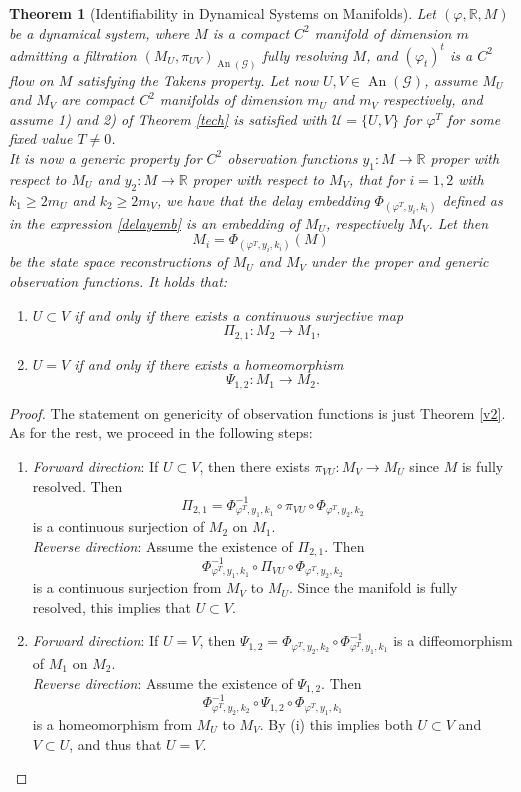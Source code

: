 \documentclass[11pt, a4paper]{memoir}
\theoremstyle{break}
\newtheorem{thm}{Theorem}
\theoremstyle{break}
\theoremstyle{nonumberplain}
\newtheorem{proof}{Proof}
\newcommand{\mR}{\mathbb{R}}
\DeclareMathOperator{\an}{An}
\begin{document}
\begin{thm}[Identifiability in Dynamical Systems on Manifolds]\label{id1}
Let $(\varphi,\mR,M)$ be a dynamical system, where $M$ is a compact $C^2$ manifold of dimension $m$ admitting a filtration $(M_U,\pi_{UV})_{\an(\mathcal{G})}$ fully resolving $M$, and $(\varphi_t)^t$ is a $C^2$ flow on $M$ satisfying the Takens property. Let now $U,V\in \an(\mathcal{G})$, assume $M_U$ and $M_V$ are compact $C^2$ manifolds of dimension $m_U$ and $m_V$ respectively, and assume 1) and 2) of Theorem \ref{tech} is satisfied with $\mathcal{U}=\{U,V\}$ for $\varphi^T$ for some fixed value $T\neq 0$.\\[5pt]
It is now a generic property for $C^2$ observation functions $y_1:M\to \mR$ proper with respect to $M_U$ and $y_2:M\to\mR$ proper with respect to $M_V$, that for $i=1,2$ with $k_1\geqslant 2m_U$ and $k_2\geqslant 2m_V$, we have that the delay embedding $\Phi_{(\varphi^T,y_i,k_i)}$ defined as in the expression \ref{delayemb} is an embedding of $M_U$, respectively $M_V$. Let then $$M_i=\Phi_{(\varphi^T,y_i,k_i)}(M)$$ 
be the state space reconstructions of $M_U$ and $M_V$ under the proper and generic observation functions. It holds that:
\begin{enumerate}[label=(\roman*)]
	\item $U\subset V$ if and only if there exists a continuous surjective map
	$$\Pi_{2,1}:M_2\to M_1,$$ 
	\item $U=V$ if and only if there exists a homeomorphism
	$$\Psi_{1,2}:M_1\to M_2.$$
\end{enumerate}
\end{thm}
\begin{proof}
The statement on genericity of observation functions is just Theorem \ref{v2}. As for the rest, we proceed in the following steps:
\begin{enumerate}[label=(\roman*)]
	\item \textit{Forward direction}: If $U\subset V$, then there exists $\pi_{VU}:M_V\to M_U$ since $M$ is fully resolved. Then
	$$\Pi_{2,1}=\Phi_{\varphi^T,y_1,k_1}^{-1}\circ\pi_{VU}\circ \Phi_{\varphi^T,y_2,k_2} $$ is a continuous surjection of $M_2$ on $M_1$.\\[5pt]
	\textit{Reverse direction}: Assume the existence of $\Pi_{2,1}$. Then
	$$\Phi_{\varphi^T,y_1,k_1}^{-1} \circ\Pi_{VU}\circ  \Phi_{\varphi^T,y_2,k_2} $$
	is a continuous surjection from $M_V$ to $M_U$. Since the manifold is fully resolved, this implies that $U\subset V$.
	\item \textit{Forward direction}: If $U=V$, then $\Psi_{1,2}=\Phi_{\varphi^T,y_2,k_2}\circ \Phi_{\varphi^T,y_1,k_1}^{-1}$ is a diffeomorphism of $M_1$ on $M_2$.\\[5pt]
	\textit{Reverse direction}: Assume the existence of $\Psi_{1,2}$. Then
	$$\Phi_{\varphi^T,y_2,k_2}^{-1}\circ \Psi_{1,2} \circ \Phi_{\varphi^T,y_1,k_1}$$
	is a homeomorphism from $M_U$ to $M_V$. By (i) this implies both $U\subset V$ and $V\subset U$, and thus that $U=V$.
\end{enumerate}
\end{proof}
\end{document}

